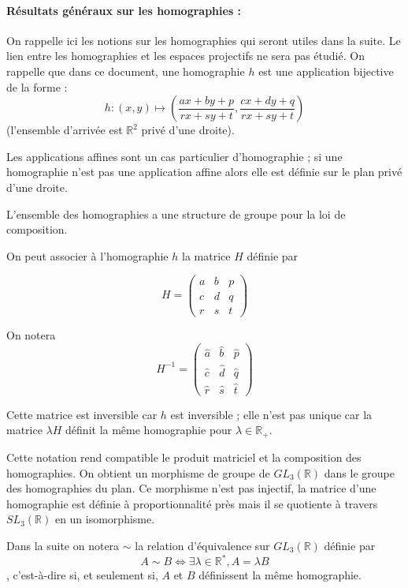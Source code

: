 \paragraph{Résultats généraux sur les homographies :}
 On rappelle ici les notions sur les homographies qui seront utiles dans la suite. Le lien entre les homographies et les espaces projectifs ne sera pas étudié. On rappelle que dans ce document, une homographie $h$ est une application bijective de la forme :
	\[h:(x,y)\mapsto \left(\frac{ax+by+p}{rx+sy+t},\frac{cx+dy+q}{rx+sy+t}\right)\]
(l'ensemble d'arrivée est $\mathbb R^2$ privé d'une droite).

Les applications affines sont un cas particulier d'homographie ; si une homographie n'est pas une application affine alors elle est définie sur le plan privé d'une droite.

L'ensemble des homographies a une structure de groupe pour la loi de composition.

On peut associer à l'homographie $h$ la matrice $H$ définie par
  
\begin{equation*}
	H=\begin{pmatrix}
	a&b&p\\c&d&q\\r&s&t
	\end{pmatrix}
\end{equation*}
 
 On notera
 \begin{equation*}
 H^{-1}=\begin{pmatrix} \hat a&\hat b&\hat p\\ \hat c&\hat d&\hat q\\ \hat r&\hat s&\hat t \end{pmatrix}
 \end{equation*}

Cette matrice est inversible car $h$ est inversible ; elle n'est pas unique car la matrice $\lambda H$ définit la même homographie pour $\lambda \in \mathbb{R}_+$.

Cette notation rend compatible le produit matriciel et la composition des homographies. On obtient un morphisme de groupe de $GL_{3}(\mathbb{R})$ dans le groupe des homographies du plan. Ce morphisme n'est pas injectif, la matrice d'une homographie est définie à proportionnalité près mais il se quotiente à travers $SL_{3}(\mathbb{R})$ en un isomorphisme.

Dans la suite on notera $\sim$ la relation d'équivalence  sur $GL_{3}(\mathbb{R})$ définie par \[A\sim B \iff \exists \lambda\in \mathbb{R}^{*} , A=\lambda B\], c'est-à-dire si, et seulement si, $A$ et $B$ définissent la même homographie.

